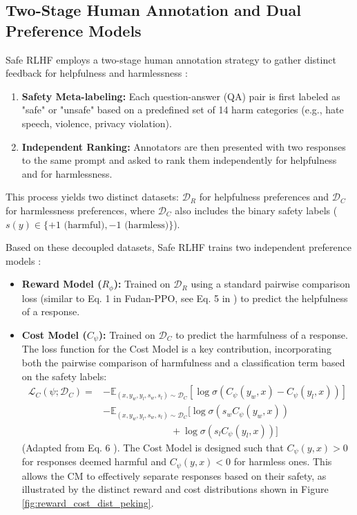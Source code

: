 \documentclass{article} %
\begin{document}
\subsection{Two-Stage Human Annotation and Dual Preference Models}
Safe RLHF employs a two-stage human annotation strategy to gather distinct feedback for helpfulness and harmlessness \cite{Dai2023SafeRLHF}:
\begin{enumerate}
    \item \textbf{Safety Meta-labeling:} Each question-answer (QA) pair is first labeled as "safe" or "unsafe" based on a predefined set of 14 harm categories (e.g., hate speech, violence, privacy violation).
    \item \textbf{Independent Ranking:} Annotators are then presented with two responses to the same prompt and asked to rank them independently for helpfulness and for harmlessness.
\end{enumerate}
This process yields two distinct datasets: $\mathcal{D}_R$ for helpfulness preferences and $\mathcal{D}_C$ for harmlessness preferences, where $\mathcal{D}_C$ also includes the binary safety labels ($s(y) \in \{+1 \text{ (harmful)}, -1 \text{ (harmless)}\}$).

Based on these decoupled datasets, Safe RLHF trains two independent preference models \cite{Dai2023SafeRLHF}:
\begin{itemize}
    \item \textbf{Reward Model ($R_\phi$):} Trained on $\mathcal{D}_R$ using a standard pairwise comparison loss (similar to Eq. 1 in Fudan-PPO, see Eq. 5 in \cite{Dai2023SafeRLHF}) to predict the helpfulness of a response.
    \item \textbf{Cost Model ($C_\psi$):} Trained on $\mathcal{D}_C$ to predict the harmfulness of a response. The loss function for the Cost Model is a key contribution, incorporating both the pairwise comparison of harmfulness and a classification term based on the safety labels:
    \begin{align*}
    \mathcal{L}_{C}(\psi;\mathcal{D}_{C}) = &-\mathbb{E}_{(x,y_w,y_l,s_w,s_l)\sim\mathcal{D}_{C}}[\log\sigma(C_{\psi}(y_w,x)-C_{\psi}(y_l,x))] \\
                         &-\mathbb{E}_{(x,y_w,y_l,s_w,s_l)\sim\mathcal{D}_{C}}[\log\sigma(s_w C_{\psi}(y_w,x)) \\
                         & \qquad \qquad \qquad \quad + \log\sigma(s_l C_{\psi}(y_l,x))]
    \end{align*}
    (Adapted from Eq. 6 \cite{Dai2023SafeRLHF}). The Cost Model is designed such that $C_\psi(y,x) > 0$ for responses deemed harmful and $C_\psi(y,x) < 0$ for harmless ones. This allows the CM to effectively separate responses based on their safety, as illustrated by the distinct reward and cost distributions shown in Figure \ref{fig:reward_cost_dist_peking}.
\end{itemize}
\end{document}
